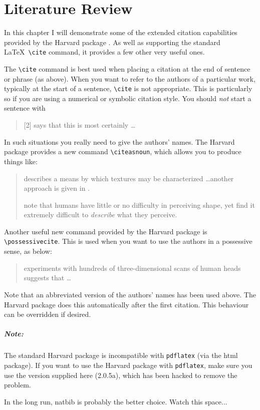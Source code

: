 \chapter{Literature Review}

In this chapter I will demonstrate some of the extended citation
capabilities provided by the {\sf Harvard} package \cite{WiS1994}. As well
as supporting the standard \LaTeX\ \verb+\cite+ command, it provides a
few other very useful ones.

The \verb+\cite+ command is best used when placing a citation at the end of
sentence or phrase (as above). When you want to refer to the authors of a
particular work, typically at the start of a sentence, \verb+\cite+ is not
appropriate. This is particularly so if you are using a numerical or
symbolic citation style. You should \emph{not} start a sentence with
\begin{quote}
[2] says that this is most certainly \ldots
\end{quote}
In such situations you really need to give the authors' names. The {\sf
Harvard} package provides a new command \verb+\citeasnoun+, which allows
you to produce things like:
\begin{quote}
 describes a means by which textures may be
characterized \ldots another approach is given in .

 note that humans have little or no difficulty in
perceiving shape, yet find it extremely difficult to \emph{describe} what
they perceive.
\end{quote}

Another useful new command provided by the {\sf Harvard} package is
\verb+\possessivecite+. This is used when you want to use the authors in a
possessive sense, as below:
\begin{quote}
 experiments with hundreds of three-dimensional scans of human heads suggests that \ldots
\end{quote}
Note that an abbreviated version of the authors' names has been used above.
The {\sf Harvard} package does this automatically after the first citation.
This behaviour can be overridden if desired.

\paragraph{Note:} The standard {\sf Harvard} package is incompatible with
\texttt{pdflatex} (via the {\sf html} package). If you want to use the {\sf
Harvard} package with \texttt{pdflatex}, make sure you use the version
supplied here (2.0.5a), which has been hacked to remove the problem.

In the long run, {\sf natbib} is probably the better choice. Watch this
space...
